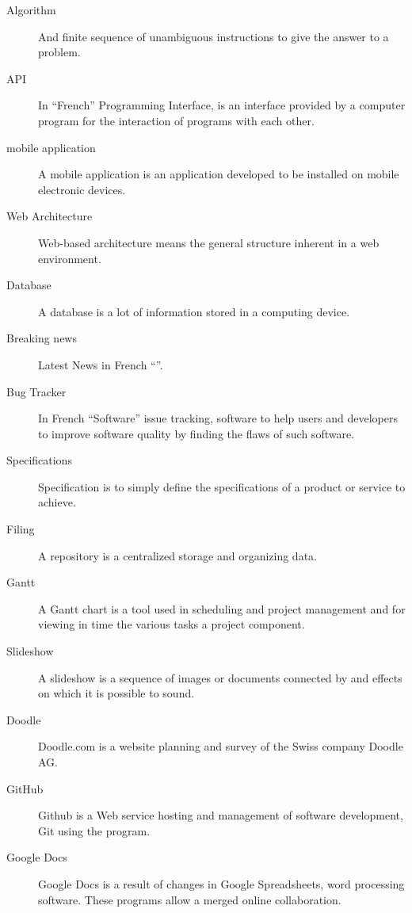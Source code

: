 \documentclass {life-en}
\begin{document}
\begin{description}
\item [Algorithm]
And finite sequence of unambiguous instructions to give the answer to a problem.
\item [API]
In ``French'' Programming Interface, is an interface provided by a computer program for the interaction of programs with each other.

\item [mobile application]
A mobile application is an application developed to be installed on mobile electronic devices.

\item [Web Architecture]
Web-based architecture means the general structure inherent in a web environment.

\item [Database]
A database is a lot of information stored in a computing device.

\item [Breaking news]
Latest News in French ``''.

\item [Bug Tracker]
In French ``Software'' issue tracking, software to help users and developers to improve software quality by finding the flaws of such software.

\item [Specifications]
Specification is to simply define the specifications of a product or service to achieve.

\item [Filing]
A repository is a centralized storage and organizing data.

\item [Gantt]
A Gantt chart is a tool used in scheduling and project management and for viewing in time the various tasks a project component.

\item [Slideshow]
A slideshow is a sequence of images or documents connected by and effects on which it is possible to sound.

\item [Doodle]
Doodle.com is a website planning and survey of the Swiss company Doodle AG.

\item [GitHub]
Github is a Web service hosting and management of software development, Git using the program. 

\item [Google Docs]
Google Docs is a result of changes in Google Spreadsheets, word processing software. These programs allow a merged online collaboration.


\end{description}
\end{document}
